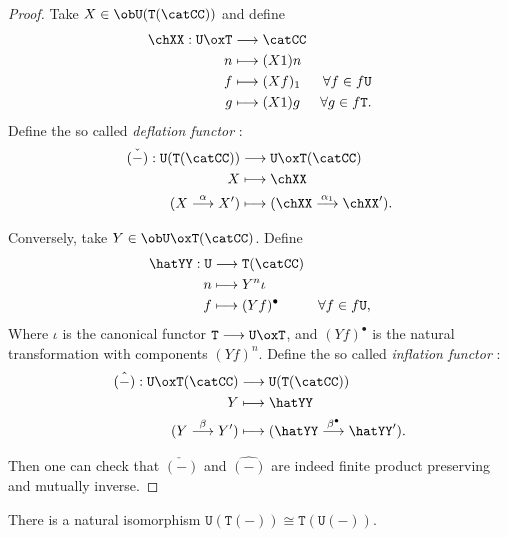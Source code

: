 \documentclass[a4paper, 12pt]{article}
\newcommand{\theory}{\mathtt}
\begin{document}
\begin{proof}
	Take $X \in \ob \theory{U} (\theory{T} (\catCC))$ and define
	\begin{align*}
		\chXX : \theory{U} \ox \theory{T} &\longrightarrow \catCC \\
		n &\longmapsto (X1)n \\
		f &\longmapsto (Xf)_1 & \forall f \in f \theory{U} \\
		g &\longmapsto (X1) g & \forall g \in f \theory{T} .
	\end{align*}
	Define the so called \emph{deflation functor} :
	\begin{align*}
		\check{(-)} : \theory{U} (\theory{T} (\catCC)) &\longrightarrow \theory{U} \ox \theory{T} (\catCC) \\
		X &\longmapsto \chXX \\
		(X \stackrel{\alpha}{\longrightarrow} X') &\longmapsto (\chXX \stackrel{\alpha_1}{\longrightarrow} \chXX') .
	\end{align*}

	Conversely, take $Y \in \ob \theory{U} \ox \theory{T} (\catCC)$. Define
	\begin{align*}
		\hatYY : \theory{U} &\longrightarrow \theory{T} (\catCC) \\
		n &\longmapsto Y^n \iota \\
		f &\longmapsto (Yf)^\bullet & \forall f \in f \theory{U} ,
	\end{align*}
	Where $\iota$ is the canonical functor $\theory{T} \longrightarrow \theory{U} \ox \theory{T}$, and $(Yf)^\bullet$ is the natural transformation with components $(Yf)^n$. Define the so called \emph{inflation functor} :
	\begin{align*}
		\hat{(-)} : \theory{U} \ox \theory{T} (\catCC) &\longrightarrow \theory{U} (\theory{T} (\catCC)) \\
		Y &\longmapsto \hatYY \\
		(Y \stackrel{\beta}{\longrightarrow} Y') &\longmapsto (\hatYY \stackrel{\beta^\bullet}{\longrightarrow} \hatYY') .
	\end{align*}

	Then one can check that $\check{(-)}$ and $\hat{(-)}$ are indeed finite product preserving and mutually inverse.
\end{proof}

\begin{corollary}
	There is a natural isomorphism $\theory{U} (\theory{T} (-)) \cong \theory{T} (\theory{U} (-))$.
\end{corollary}
\end{document}
